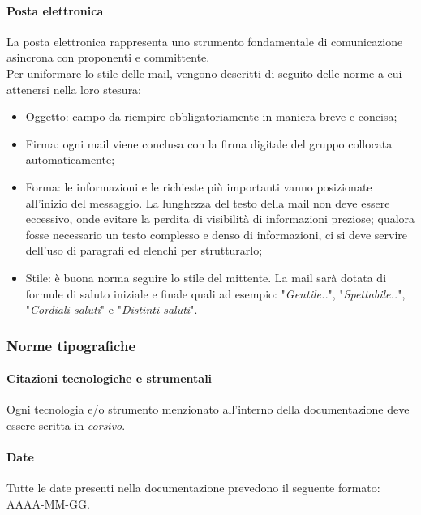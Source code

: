 \documentclass[10pt, a4paper]{article}
\begin{document}
    \paragraph{Posta elettronica}La posta elettronica rappresenta uno strumento fondamentale di comunicazione asincrona con proponenti e committente.\\ 
    Per uniformare lo stile delle mail, vengono descritti di seguito delle norme a cui attenersi nella loro stesura:
    \begin{itemize}
        \item Oggetto: campo da riempire obbligatoriamente in maniera breve e concisa;
        \item Firma: ogni mail viene conclusa con la firma digitale del gruppo collocata automaticamente;
        \item Forma: le informazioni e le richieste più importanti vanno posizionate all'inizio del messaggio. La lunghezza del testo della mail non deve essere eccessivo, onde evitare la perdita di visibilità di informazioni preziose; qualora fosse necessario un testo complesso e denso di informazioni, ci si deve servire dell'uso di paragrafi ed elenchi per strutturarlo;
        \item Stile: è buona norma seguire lo stile del mittente. La mail sarà dotata di formule di saluto iniziale e finale quali ad esempio: "\textit{Gentile..}", "\textit{Spettabile..}", "\textit{Cordiali saluti}" e "\textit{Distinti saluti}".
    \end{itemize}
    
    \subsubsection{Norme tipografiche}
        \paragraph{Citazioni tecnologiche e strumentali}Ogni tecnologia e/o strumento menzionato all'interno della documentazione deve essere scritta in \textit{corsivo}.
        
        \paragraph{Date}Tutte le date presenti nella documentazione prevedono il seguente formato: AAAA-MM-GG.
        
\end{document}
